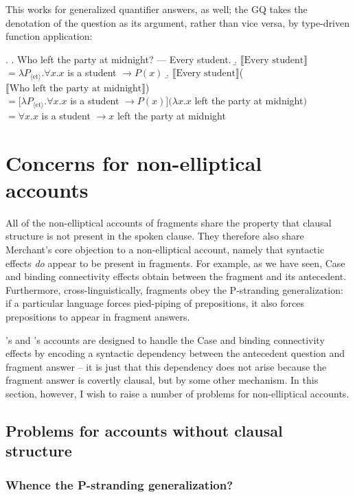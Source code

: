 \documentclass[doublespace]{umthesis}
\newcommand{\ext}[1]{\ensuremath{\llbracket \textrm{{#1}} \rrbracket}}
\newcommand{\ty}[1]{\ensuremath{\mathrm{\langle #1 \rangle}}}
\begin{document}
This works for generalized quantifier answers, as well; the GQ takes the denotation of the question as its argument, rather than vice versa, by type-driven function application:

\ex. 	\a. Who left the party at midnight? --- Every student.
	\b. \ext{Every student} $= \lambda P_{\ty{et}}. \forall x. x$ is a student $\rightarrow P(x)$
	\b. \ext{Every student}(\ext{Who left the party at midnight})\\
		$= [\lambda P_{\ty{et}}. \forall x. x$ is a student $\rightarrow P(x)](\lambda x. x$ left the party at midnight$)$\\
		$= \forall x. x$ is a student $\rightarrow x$ left the party at midnight
		

\section{Concerns for non-elliptical accounts} 

All of the non-elliptical accounts of fragments share the property that clausal structure is not present in the spoken clause. They therefore also share Merchant's core objection to a non-elliptical account, namely that syntactic effects \emph{do} appear to be present in fragments. For example, as we have seen, Case and binding connectivity effects obtain between the fragment and its antecedent. Furthermore, cross-linguistically, fragments obey the P-stranding generalization: if a particular language forces pied-piping of prepositions, it also forces prepositions to appear in fragment answers.

\cite{GS00}'s and \cite{Ja13}'s accounts are designed to handle the Case and binding connectivity effects by encoding a syntactic dependency between the antecedent question and fragment answer -- it is just that this dependency does not arise because the fragment answer is covertly clausal, but by some other mechanism. In this section, however, I wish to raise a number of problems for non-elliptical accounts.

\subsection{Problems for accounts without clausal structure}

\subsubsection{Whence the P-stranding generalization?}
\end{document}
